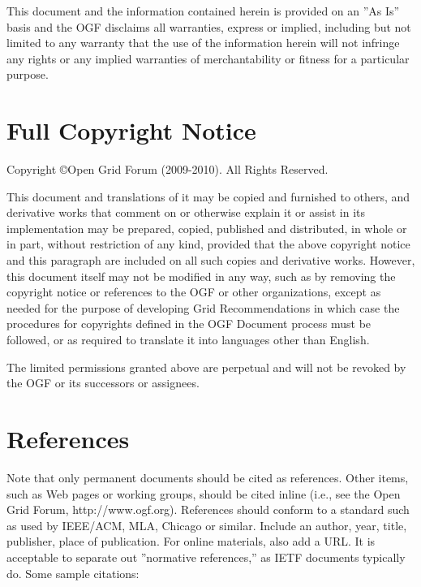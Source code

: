 \documentclass[10pt,a4paper]{article}
\begin{document}
This document and the information contained herein is provided on an ''As Is'' basis and the OGF disclaims all warranties, express or implied, including but not limited to any warranty that the use of the information herein will not infringe any rights or any implied warranties of merchantability or fitness for a particular purpose.

\section{Full Copyright Notice}

Copyright \copyright Open Grid Forum (2009-2010). All Rights Reserved.

This document and translations of it may be copied and furnished to others, and derivative works that comment on or otherwise explain it or assist in its implementation may be prepared, copied, published and distributed, in whole or in part, without restriction of any kind, provided that the above copyright notice and this paragraph are included on all such copies and derivative works. However, this document itself may not be modified in any way, such as by removing the copyright notice or references to the OGF or other organizations, except as needed for the purpose of developing Grid Recommendations in which case the procedures for copyrights defined in the OGF Document process must be followed, or as required to translate it into languages other than English.

The limited permissions granted above are perpetual and will not be revoked by the OGF or its successors or assignees.

\section{References}

Note that only permanent documents should be cited as references. Other items, such as Web pages or working groups, should be cited inline (i.e., see the Open Grid Forum, http://www.ogf.org). References should conform to a standard such as used by IEEE/ACM, MLA, Chicago or similar. Include an author, year, title, publisher, place of publication. For online materials, also add a URL. It is acceptable to separate out ''normative references,'' as IETF documents typically do. Some sample citations: 
\end{document}
